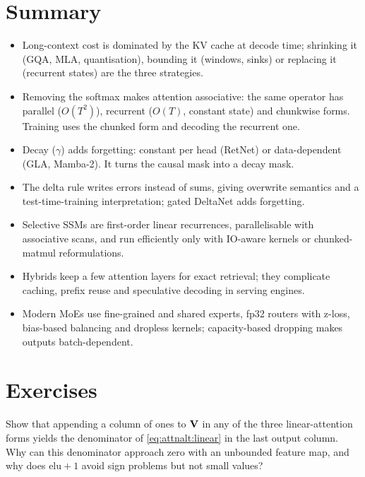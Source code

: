 \section{Summary}\label{sec:attnalt:summary}
\begin{itemize}
\item Long-context cost is dominated by the KV cache at decode time; shrinking it (GQA, MLA, quantisation),
  bounding it (windows, sinks) or replacing it (recurrent states) are the three strategies.
\item Removing the softmax makes attention associative: the same operator has parallel ($O(T^2)$),
  recurrent ($O(T)$, constant state) and chunkwise forms. Training uses the chunked form and decoding the
  recurrent one.
\item Decay ($\gamma$) adds forgetting: constant per head (RetNet) or data-dependent (GLA, Mamba-2). It turns
  the causal mask into a decay mask.
\item The delta rule writes errors instead of sums, giving overwrite semantics and a test-time-training
  interpretation; gated DeltaNet adds forgetting.
\item Selective SSMs are first-order linear recurrences, parallelisable with associative scans, and run
  efficiently only with IO-aware kernels or chunked-matmul reformulations.
\item Hybrids keep a few attention layers for exact retrieval; they complicate caching, prefix reuse and
  speculative decoding in serving engines.
\item Modern MoEs use fine-grained and shared experts, fp32 routers with z-loss, bias-based balancing and
  dropless kernels; capacity-based dropping makes outputs batch-dependent.
\end{itemize}

\section{Exercises}\label{sec:attnalt:exercises}

\begin{exercise}
Show that appending a column of ones to $\mathbf{V}$ in any of the three linear-attention forms yields the
denominator of \cref{eq:attnalt:linear} in the last output column. Why can this denominator approach zero
with an unbounded feature map, and why does $\mathrm{elu}+1$ avoid sign problems but not small values?
\end{exercise}

